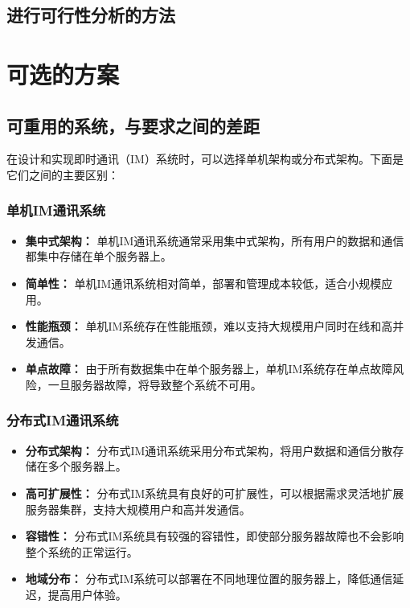 \documentclass[12pt]{article}
\begin{document}
	
	
	
	
	\subsection{进行可行性分析的方法}
	\section{可选的方案}
	
	\subsection{可重用的系统，与要求之间的差距}
	在设计和实现即时通讯（IM）系统时，可以选择单机架构或分布式架构。下面是它们之间的主要区别：
	
	\subsubsection{单机IM通讯系统}
	\begin{itemize}
		\item \textbf{集中式架构：} 单机IM通讯系统通常采用集中式架构，所有用户的数据和通信都集中存储在单个服务器上。
		\item \textbf{简单性：} 单机IM通讯系统相对简单，部署和管理成本较低，适合小规模应用。
		\item \textbf{性能瓶颈：} 单机IM系统存在性能瓶颈，难以支持大规模用户同时在线和高并发通信。
		\item \textbf{单点故障：} 由于所有数据集中在单个服务器上，单机IM系统存在单点故障风险，一旦服务器故障，将导致整个系统不可用。
	\end{itemize}
	
	\subsubsection{分布式IM通讯系统}
	\begin{itemize}
		\item \textbf{分布式架构：} 分布式IM通讯系统采用分布式架构，将用户数据和通信分散存储在多个服务器上。
		\item \textbf{高可扩展性：} 分布式IM系统具有良好的可扩展性，可以根据需求灵活地扩展服务器集群，支持大规模用户和高并发通信。
		\item \textbf{容错性：} 分布式IM系统具有较强的容错性，即使部分服务器故障也不会影响整个系统的正常运行。
		\item \textbf{地域分布：} 分布式IM系统可以部署在不同地理位置的服务器上，降低通信延迟，提高用户体验。
	\end{itemize}
	
\end{document}
